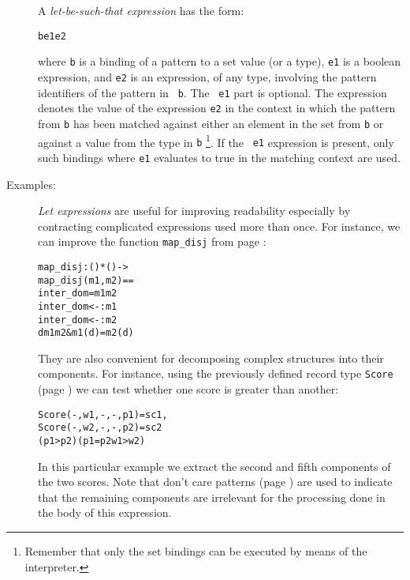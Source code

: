 \documentclass[\pformat,12pt]{article}
\begin{document}
\begin{description}
  A {\it let-be-such-that expression} has the form:
  \begin{alltt}
     b  e1  e2
  \end{alltt}%
  where {\tt b} is a binding of a pattern to a set value (or a type),
  {\tt e1} is a boolean expression, and {\tt e2} is an expression, of
  any type, involving the pattern identifiers of the pattern in {\tt
    b}. The {\tt {} e1} part is optional. The expression
  denotes the value of the expression {\tt e2} in the context in which
  the pattern from {\tt b} has been matched against either an element
  in the set from {\tt b} or against a value from the type in {\tt b}%
  \footnote{Remember that only the set bindings can be executed by
    means of the interpreter.}.
  If the {\tt {} e1} expression is present, only such bindings
  where {\tt e1} evaluates to true in the matching context are used.

\item[Examples:] {\it Let expressions} are useful for improving
  readability especially by contracting complicated expressions used
  more than once. For instance, we can improve the function
  \texttt{map\_disj} from page \pageref{mapdisj}:
\begin{alltt}
  map_disj : () * () -> 
  map_disj (m1,m2) ==
     inter_dom =  m1  m2
      inter_dom <-: m1 
      inter_dom <-: m2
    d  m1  m2 & m1(d) = m2(d)
\end{alltt}
  They are also convenient for decomposing complex
  structures into their components. For instance, using the previously
  defined record type \texttt{Score} (page \pageref{scoredef}) we can
  test whether one score is greater than another:
  \begin{alltt}
     Score(-,w1,-,-,p1) = sc1,
       Score(-,w2,-,-,p2) = sc2
     (p1 > p2)  (p1 = p2  w1 > w2)
  \end{alltt}
  In this
  particular example we extract the second and fifth components of the
  two scores. Note that don't care
  patterns (page \pageref{patterns}) are used to indicate that the
  remaining components are irrelevant 
  for the processing done in the body of this expression.
  

\end{description}
\end{document}
